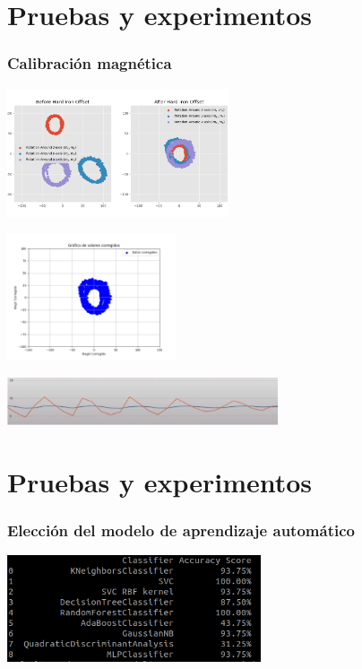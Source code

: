 \documentclass{beamer}
\begin{document}
\section{Pruebas y experimentos}
\begin{frame}
\frametitle{Calibración magnética}
\centering

\begin{minipage}{0.45\textwidth}
    \centering
    \includegraphics[width=6.5cm]{figs/hard_iron_calibration.png}
\end{minipage}
\hfill
\begin{minipage}{0.45\textwidth}
    \centering
    \includegraphics[width=5.0cm]{figs/soft_iron_calibration.png}
\end{minipage}

\vspace{0.5cm} %

\begin{minipage}{0.7\textwidth}
    \centering
    \includegraphics[width=8.0cm]{figs/low.png} %
\end{minipage}
\hfill


\end{frame}


\section{Pruebas y experimentos}
\begin{frame}
\frametitle{Elección del modelo de aprendizaje automático}
\centering

\begin{minipage}{0.5\textwidth}
    \centering
    \includegraphics[width=7.5cm]{figs/modelos.png}
\end{minipage}
\hfill

\end{frame}
\end{document}
